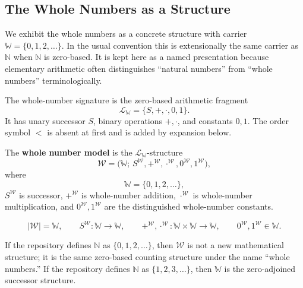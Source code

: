 \subsection*{The Whole Numbers as a Structure}
\label{subsec:whole-numbers-as-a-structure}

\begin{remark*}
We exhibit the whole numbers as a concrete structure with carrier
$\mathbb{W}=\{0,1,2,\ldots\}$. In the usual convention this is extensionally the
same carrier as $\mathbb{N}$ when $\mathbb{N}$ is zero-based. It is kept here as
a named presentation because elementary arithmetic often distinguishes
``natural numbers'' from ``whole numbers'' terminologically.
\end{remark*}

\begin{remark*}[Exposition]
The whole-number signature is the zero-based arithmetic fragment
\[
\mathcal{L}_{\mathbb{W}}=\{S,+,\cdot,0,1\}.
\]
It has unary successor $S$, binary operations $+,\cdot$, and constants $0,1$.
The order symbol $<$ is absent at first and is added by expansion below.
\end{remark*}

\begin{definition}
\label{def:whole-number-model}
The \textbf{whole number model} is the $\mathcal{L}_{\mathbb{W}}$-structure
\[
\mathcal{W}
=
\bigl(\mathbb{W};\,
S^{\mathcal{W}},+^{\mathcal{W}},\cdot^{\mathcal{W}},
0^{\mathcal{W}},1^{\mathcal{W}}\bigr),
\]
where
\[
\mathbb{W}=\{0,1,2,\ldots\},
\]
$S^{\mathcal{W}}$ is successor, $+^{\mathcal{W}}$ is whole-number addition,
$\cdot^{\mathcal{W}}$ is whole-number multiplication, and
$0^{\mathcal{W}},1^{\mathcal{W}}$ are the distinguished whole-number constants.
\end{definition}

\begin{remark*}
\[
|\mathcal{W}|=\mathbb{W},\qquad
S^{\mathcal{W}}:\mathbb{W}\to\mathbb{W},\qquad
+^{\mathcal{W}},\cdot^{\mathcal{W}}:\mathbb{W}\times\mathbb{W}\to\mathbb{W},
\qquad
0^{\mathcal{W}},1^{\mathcal{W}}\in\mathbb{W}.
\]
\end{remark*}

\begin{remark*}[Interpretation]
If the repository defines $\mathbb{N}$ as $\{0,1,2,\ldots\}$, then
$\mathcal{W}$ is not a new mathematical structure; it is the same zero-based
counting structure under the name ``whole numbers.'' If the repository defines
$\mathbb{N}$ as $\{1,2,3,\ldots\}$, then $\mathbb{W}$ is the zero-adjoined
successor structure.
\end{remark*}

